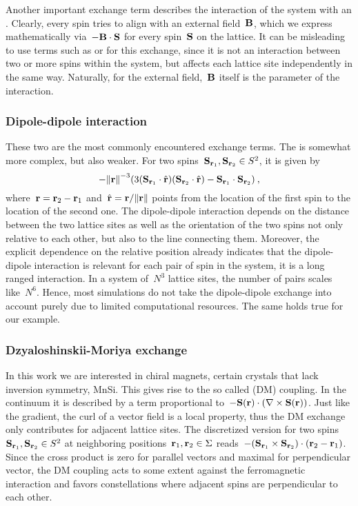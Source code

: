 Another important exchange term describes the interaction of the system with an
. Clearly, every spin tries to align with an
external field~$\B$, which we express mathematically via~$-\B \cdot \S$ for
every spin~$\S$ on the lattice. It can be misleading to use terms such as
 or  for this exchange, since it is not
an interaction between two or more spins within the system, but affects each
lattice site independently in the same way. Naturally, for the external
field,~$\B$ itself is the parameter of the interaction.

\subsubsection{Dipole-dipole interaction}

These two are the most commonly encountered exchange terms. The
 is somewhat more complex, but also weaker.
For two spins~$\S_{\r_1}, \S_{\r_2} \in S^2$, it is given by
%
\begin{equation}
  - {\norm{\r}^{-3}} (3 (\S_{\r_1} \cdot \hat{\r})
  (\S_{\r_2} \cdot \hat{\r}) - \S_{\r_1} \cdot \S_{\r_2})\:,
\end{equation}
%
where~$\r = \r_2 - \r_1$ and~$\hat{\r} = \r / \norm{\r}$ points from the
location of the first spin to the location of the second one. The dipole-dipole
interaction depends on the distance between the two lattice sites as well as the
orientation of the two spins not only relative to each other, but also to the
line connecting them. Moreover, the explicit dependence on the relative position
already indicates that the dipole-dipole interaction is relevant for each pair
of spin in the system, it is a long ranged interaction. In a system of~$N^3$
lattice sites, the number of pairs scales like~$N^6$. Hence, most simulations do
not take the dipole-dipole exchange into account purely due to limited
computational resources. The same holds true for our example.

\subsubsection{Dzyaloshinskii-Moriya exchange}

In this work we are interested in chiral magnets, certain crystals that lack
inversion symmetry, \eg{} MnSi. This gives rise to the so called  (DM) coupling. In the continuum it is described by a term
proportional to~$-\S(\r) \cdot (\nabla \times \S(\r))$. Just like the gradient,
the curl of a vector field is a local property, thus the DM exchange only
contributes for adjacent lattice sites. The discretized version for two
spins~$\S_{\r_1}, \S_{\r_2} \in S^2$ at neighboring positions~$\r_1, \r_2 \in
\Sigma$ reads~$- (\S_{\r_1} \times \S_{\r_2}) \cdot (\r_2 - \r_1)$.  Since the
cross product is zero for parallel vectors and maximal for perpendicular vector,
the DM coupling acts to some extent against the ferromagnetic interaction and
favors constellations where adjacent spins are perpendicular to each other.

